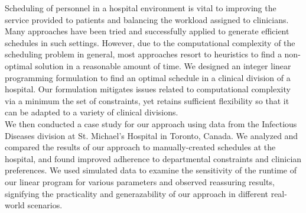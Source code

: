 Scheduling of personnel in a hospital environment is vital to improving the service provided to patients and balancing the workload assigned to clinicians. Many approaches have been tried and successfully applied to generate efficient schedules in such settings. However, due to the computational complexity of the scheduling problem in general, most approaches resort to heuristics to find a non-optimal solution in a reasonable amount of time. We designed an integer linear programming formulation to find an optimal schedule in a clinical division of a hospital. Our formulation mitigates issues related to computational complexity via a minimum the set of constraints, yet retains sufficient flexibility so that it can be adapted to a variety of clinical divisions. \\

We then conducted a case study for our approach using data from the Infectious Diseases division at St. Michael's Hospital in Toronto, Canada. We analyzed and compared the results of our approach to manually-created schedules at the hospital, and found improved adherence to departmental constraints and clinician preferences. We used simulated data to examine the sensitivity of the runtime of our linear program for various parameters and observed reassuring results, signifying the practicality and generazability of our approach in different real-world scenarios.